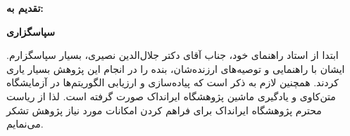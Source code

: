 \thispagestyle{empty}

\noindent
\textbf{\Large تقدیم به:}
\vskip 1cm

\newpage
\thispagestyle{empty}

\begin{center}
\textbf{\Large سپاسگزاری}
\end{center}
\vskip 1cm
\noindent ابتدا از استاد راهنمای خود، جناب آقای دکتر جلال‌الدین نصیری، بسیار سپاسگزارم. ایشان با راهنمایی و توصیه‌های ارزنده‌شان، بنده را در انجام این پژوهش بسیار یاری کردند.  همچنین لازم به ذکر است که پیاده‌سازی و ارزیابی الگوریتم‌ها در آزمایشگاه متن‌کاوی و یادگیری ماشین  پژوهشگاه ایرانداک صورت گرفته است. لذا از ریاست محترم پژوهشگاه ایرانداک برای فراهم کردن امکانات مورد نیاز پژوهش تشکر می‌نمایم. 

\vskip 1cm
